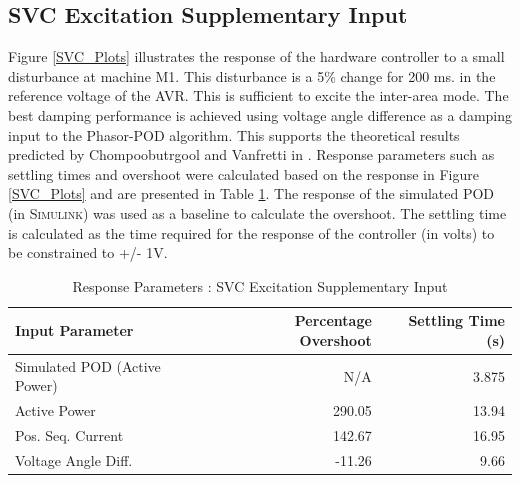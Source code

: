 \documentclass[journal]{IEEEtran}
\begin{document}
\subsection{SVC Excitation Supplementary Input}
Figure \ref{SVC_Plots} illustrates the response of the hardware controller to a small disturbance at machine M1. This disturbance is a 5\% change for 200 ms. in the reference voltage of the AVR. This is sufficient to excite the inter-area mode. The best damping performance is achieved using voltage angle difference as a damping input to the Phasor-POD algorithm. This supports the theoretical results predicted by Chompoobutrgool and Vanfretti in \cite{Yuwa}. Response parameters such as settling times and overshoot were calculated based on the response in Figure \ref{SVC_Plots} and are presented in Table \ref{SVCResponseTable}. The response of the simulated POD (in \textsc{Simulink}) was used as a baseline to calculate the overshoot. The settling time is calculated as the time required for the response of the controller (in volts) to be constrained to +/- 1V.
\begin{table}[!ht]
\caption{Response Parameters : SVC Excitation Supplementary Input}\label{SVCResponseTable}
\begin{center}
\begin{tabular}{|l|r|r|}
\hline \textbf{Input Parameter} & \textbf{Percentage Overshoot} & \textbf{Settling Time (s)} \\
\hline Simulated POD (Active Power)& N/A & 3.875 \\ 
\hline Active Power & 290.05 & 13.94 \\ 
\hline Pos. Seq. Current & 142.67 & 16.95\\ 
\hline Voltage Angle Diff. & -11.26 & 9.66\\ 
\hline 
\end{tabular}
\end{center}
\vspace{-1em}
\end{table}  

\end{document}
